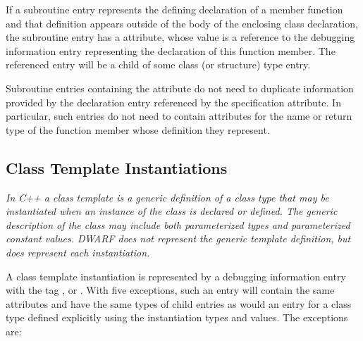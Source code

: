 If a subroutine entry represents the defining declaration
of a member function and that definition appears outside of
the body of the enclosing class declaration, the subroutine
entry has a  attribute, whose value is
a reference to the debugging information entry representing
the declaration of this function member. The referenced entry
will be a child of some class (or structure) type entry.

Subroutine entries containing the 
attribute do not need to duplicate information provided
by the declaration entry referenced by the specification
attribute. In particular, such entries do not need to contain
attributes for the name or return type of the function member
whose definition they represent.

\subsection{Class Template Instantiations}
\label{chap:classtemplateinstantiations}

\textit{In C++ a class template is a generic definition of a class
type that may be instantiated when an instance of the class
is declared or defined. The generic description of the
class may include both parameterized types and parameterized
constant values. DWARF does not represent the generic template
definition, but does represent each instantiation.}

A class template instantiation is represented by a
debugging information entry with the tag ,
 or . With five
exceptions, such an entry will contain the same attributes
and have the same types of child entries as would an entry
for a class type defined explicitly using the instantiation
types and values. The exceptions are:

